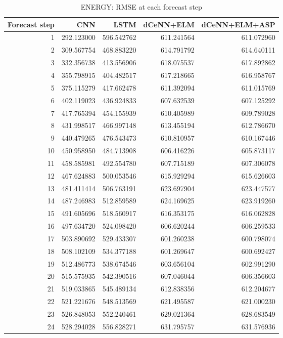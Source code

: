\begin{table}
\caption{ENERGY: RMSE at each forecast step}
\begin{tabular}{rrrrr}
\toprule
Forecast step & CNN & LSTM & dCeNN+ELM & dCeNN+ELM+ASP \\
\midrule
1 & 292.123000 & 596.542762 & 611.241564 & 611.072960 \\
2 & 309.567754 & 468.883220 & 614.791792 & 614.640111 \\
3 & 332.356738 & 413.556906 & 618.075537 & 617.892862 \\
4 & 355.798915 & 404.482517 & 617.218665 & 616.958767 \\
5 & 375.115279 & 417.662478 & 611.392094 & 611.015769 \\
6 & 402.119023 & 436.924833 & 607.632539 & 607.125292 \\
7 & 417.765394 & 454.155939 & 610.405989 & 609.789028 \\
8 & 431.998517 & 466.997148 & 613.455194 & 612.786670 \\
9 & 440.479265 & 476.543473 & 610.810957 & 610.167446 \\
10 & 450.958950 & 484.713908 & 606.416226 & 605.873117 \\
11 & 458.585981 & 492.554780 & 607.715189 & 607.306078 \\
12 & 467.624883 & 500.053546 & 615.929294 & 615.626603 \\
13 & 481.411414 & 506.763191 & 623.697904 & 623.447577 \\
14 & 487.246983 & 512.859589 & 624.169625 & 623.919260 \\
15 & 491.605696 & 518.560917 & 616.353175 & 616.062828 \\
16 & 497.634720 & 524.098420 & 606.620244 & 606.259533 \\
17 & 503.890692 & 529.433307 & 601.260238 & 600.798074 \\
18 & 508.102109 & 534.377188 & 601.269647 & 600.692427 \\
19 & 512.486773 & 538.674546 & 603.656104 & 602.991290 \\
20 & 515.575935 & 542.390516 & 607.046044 & 606.356603 \\
21 & 519.033865 & 545.489134 & 612.838356 & 612.204677 \\
22 & 521.221676 & 548.513569 & 621.495587 & 621.000230 \\
23 & 526.848053 & 552.240461 & 629.021364 & 628.683549 \\
24 & 528.294028 & 556.828271 & 631.795757 & 631.576936 \\

\end{tabular}
\end{table}
